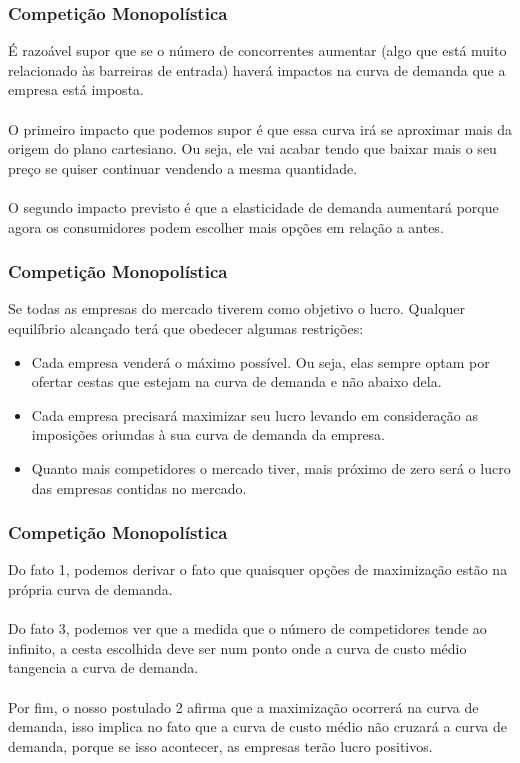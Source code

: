 \documentclass{beamer}[10]
\begin{document}
\begin{frame}
	\frametitle{Competição Monopolística}

	É razoável supor que se o número de concorrentes aumentar (algo que está muito relacionado às barreiras de entrada) haverá impactos na curva de demanda que a empresa está imposta.
	\\~\\
	O primeiro impacto que podemos supor é que essa curva irá se aproximar mais da origem do plano cartesiano. Ou seja, ele vai acabar tendo que baixar mais o seu preço se quiser continuar vendendo a mesma quantidade.
	\\~\\
	O segundo impacto previsto é que a elasticidade de demanda aumentará porque agora os consumidores podem escolher mais opções em relação a antes.

\end{frame}

\begin{frame}
	\frametitle{Competição Monopolística}

	Se todas as empresas do mercado tiverem como objetivo o lucro. Qualquer equilíbrio alcançado terá que obedecer algumas restrições:

	\begin{itemize}
		\item Cada empresa venderá o máximo possível. Ou seja, elas sempre optam por ofertar cestas que estejam na curva de demanda e não abaixo dela.
		\item Cada empresa precisará maximizar seu lucro levando em consideração as imposições oriundas à sua curva de demanda da empresa.
		\item Quanto mais competidores o mercado tiver, mais próximo de zero será o lucro das empresas contidas no mercado.
	\end{itemize}

\end{frame}

\begin{frame}
	\frametitle{Competição Monopolística}

	Do fato 1, podemos derivar o fato que quaisquer opções de maximização estão na própria curva de demanda.
	\\~\\
	Do fato 3, podemos ver que a medida que o número de competidores tende ao infinito, a cesta escolhida deve ser num ponto onde a curva de custo médio tangencia a curva de demanda.
	\\~\\
	Por fim, o nosso postulado 2 afirma que a maximização ocorrerá na curva de demanda, isso implica no fato que a curva de custo médio não cruzará a curva de demanda, porque se isso acontecer, as empresas terão lucro positivos.
\end{frame}
\end{document}
